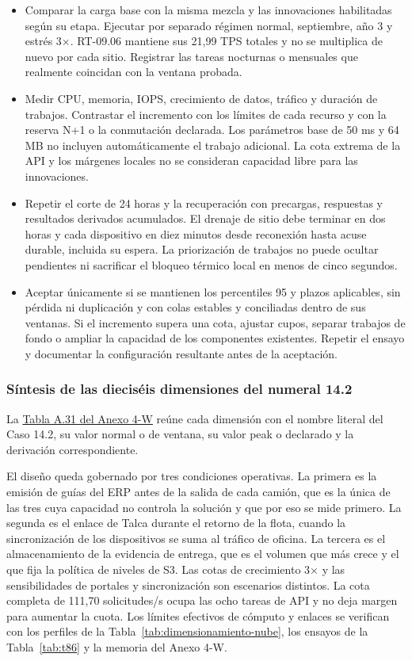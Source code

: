 \begin{itemize}
\item Comparar la carga base con la misma mezcla y las innovaciones habilitadas según su etapa. Ejecutar por separado régimen normal, septiembre, año 3 y estrés 3×. RT-09.06 mantiene sus 21,99 TPS totales y no se multiplica de nuevo por cada sitio. Registrar las tareas nocturnas o mensuales que realmente coincidan con la ventana probada.
\item Medir CPU, memoria, IOPS, crecimiento de datos, tráfico y duración de trabajos. Contrastar el incremento con los límites de cada recurso y con la reserva N+1 o la conmutación declarada. Los parámetros base de 50 ms y 64 MB no incluyen automáticamente el trabajo adicional. La cota extrema de la API y los márgenes locales no se consideran capacidad libre para las innovaciones.
\item Repetir el corte de 24 horas y la recuperación con precargas, respuestas y resultados derivados acumulados. El drenaje de sitio debe terminar en dos horas y cada dispositivo en diez minutos desde reconexión hasta acuse durable, incluida su espera. La priorización de trabajos no puede ocultar pendientes ni sacrificar el bloqueo térmico local en menos de cinco segundos.
\item Aceptar únicamente si se mantienen los percentiles 95 y plazos aplicables, sin pérdida ni duplicación y con colas estables y conciliadas dentro de sus ventanas. Si el incremento supera una cota, ajustar cupos, separar trabajos de fondo o ampliar la capacidad de los componentes existentes. Repetir el ensayo y documentar la configuración resultante antes de la aceptación.
\end{itemize}

\subsubsection{Síntesis de las dieciséis dimensiones del numeral 14.2}
\label{sec:dimensionamiento-sintesis}

La \href{LAFROX-Subdocumento4-Anexos.pdf#tab:t72}{Tabla A.31 del Anexo 4-W} reúne cada dimensión con el nombre literal del Caso 14.2, su valor normal o de ventana, su valor peak o declarado y la derivación correspondiente.



El diseño queda gobernado por tres condiciones operativas. La primera es la emisión de guías del ERP antes de la salida de cada camión, que es la única de las tres cuya capacidad no controla la solución y que por eso se mide primero. La segunda es el enlace de Talca durante el retorno de la flota, cuando la sincronización de los dispositivos se suma al tráfico de oficina. La tercera es el almacenamiento de la evidencia de entrega, que es el volumen que más crece y el que fija la política de niveles de S3. Las cotas de crecimiento 3× y las sensibilidades de portales y sincronización son escenarios distintos. La cota completa de 111,70 solicitudes/s ocupa las ocho tareas de API y no deja margen para aumentar la cuota. Los límites efectivos de cómputo y enlaces se verifican con los perfiles de la Tabla~\ref{tab:dimensionamiento-nube}, los ensayos de la Tabla~\ref{tab:t86} y la memoria del Anexo 4-W.

\label{fuente-12-k-dimensionamiento-fin}
